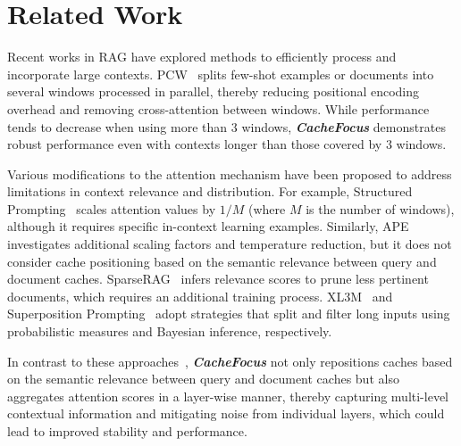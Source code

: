 \section{Related Work}
Recent works in RAG have explored methods to efficiently process and incorporate large contexts. PCW~\cite{Ratner2023ParallelContextWindows} splits few-shot examples or documents into several windows processed in parallel, thereby reducing positional encoding overhead and removing cross-attention between windows. While performance tends to decrease when using more than $3$ windows, \textbf{\textit{CacheFocus}} demonstrates robust performance even with contexts longer than those covered by $3$ windows.

Various modifications to the attention mechanism have been proposed to address limitations in context relevance and distribution. For example, Structured Prompting~\cite{Hao2022structuredpromptingScalingInContext} scales attention values by $1/M$ (where $M$ is the number of windows), although it requires specific in-context learning examples. Similarly, APE~\cite{yang2025apeFasterandLongerContextAugmented} investigates additional scaling factors and temperature reduction, but it does not consider cache positioning based on the semantic relevance between query and document caches. SparseRAG~\cite{Zhu2024AcceleratingInferenceofRetrievalAugmentedGeneration} infers relevance scores to prune less pertinent documents, which requires an additional training process. XL3M~\cite{Wang2024XL3MaTrainingfreeFrameworkforLLMLength} and Superposition Prompting~\cite{Merth2024SuperpositionPromptingImprovingandAccelerating} adopt strategies that split and filter long inputs using probabilistic measures and Bayesian inference, respectively.

In contrast to these approaches~\cite{yang2025apeFasterandLongerContextAugmented, Zhu2024AcceleratingInferenceofRetrievalAugmentedGeneration, Wang2024XL3MaTrainingfreeFrameworkforLLMLength, Merth2024SuperpositionPromptingImprovingandAccelerating}, \textbf{\textit{CacheFocus}} not only repositions caches based on the semantic relevance between query and document caches but also aggregates attention scores in a layer-wise manner, thereby capturing multi-level contextual information and mitigating noise from individual layers, which could lead to improved stability and performance.